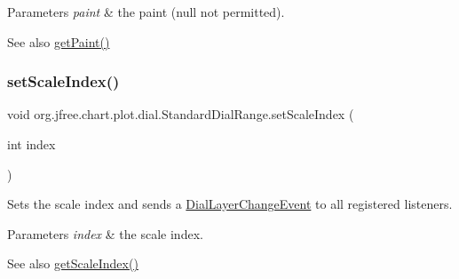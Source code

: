 \begin{DoxyParams}{Parameters}
{\em paint} & the paint ({\ttfamily null} not permitted).\\
\hline
\end{DoxyParams}
\begin{DoxySeeAlso}{See also}
\mbox{\hyperlink{classorg_1_1jfree_1_1chart_1_1plot_1_1dial_1_1_standard_dial_range_a74fc216bebcdfc919fb55d24238d090b}{get\+Paint()}} 
\end{DoxySeeAlso}
\mbox{\label{classorg_1_1jfree_1_1chart_1_1plot_1_1dial_1_1_standard_dial_range_a9ca6b99ad0d461c6dd6ae21cbeae2c9d}} 
\subsubsection{\texorpdfstring{set\+Scale\+Index()}{setScaleIndex()}}
{\footnotesize\ttfamily void org.\+jfree.\+chart.\+plot.\+dial.\+Standard\+Dial\+Range.\+set\+Scale\+Index (\begin{DoxyParamCaption}\item[{int}]{index }\end{DoxyParamCaption})}

Sets the scale index and sends a \mbox{\hyperlink{classorg_1_1jfree_1_1chart_1_1plot_1_1dial_1_1_dial_layer_change_event}{Dial\+Layer\+Change\+Event}} to all registered listeners.


\begin{DoxyParams}{Parameters}
{\em index} & the scale index.\\
\hline
\end{DoxyParams}
\begin{DoxySeeAlso}{See also}
\mbox{\hyperlink{classorg_1_1jfree_1_1chart_1_1plot_1_1dial_1_1_standard_dial_range_a019cb98d6dc8e80e906e682683f2bc6c}{get\+Scale\+Index()}} 
\end{DoxySeeAlso}
\mbox{\label{classorg_1_1jfree_1_1chart_1_1plot_1_1dial_1_1_standard_dial_range_a23793be046d52769685411c84117b287}} 
